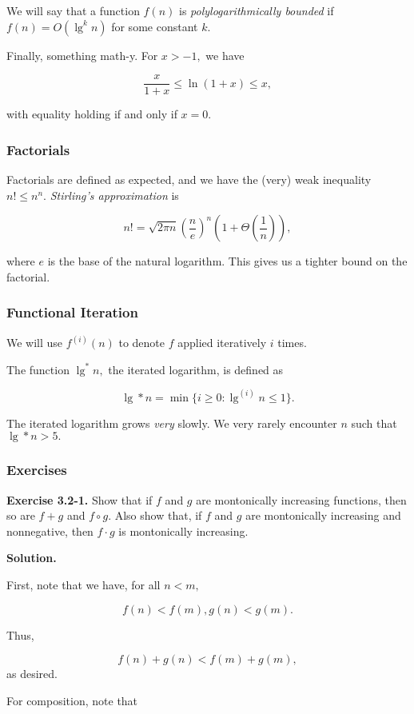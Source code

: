 \documentclass{article}
\newcommand{\exec}[2]
{\textbf{Exercise #1.} #2

\textbf{Solution.}}
\begin{document}
We will say that a function $f(n)$ is \textit{polylogarithmically bounded} if $f(n) = O(\lg^k n)$ for some constant $k.$

Finally, something math-y. For $x > -1,$ we have

$$\frac{x}{1+x} \leq \ln(1 + x) \leq x,$$

with equality holding if and only if $x = 0.$ 

\subsubsection{Factorials}

Factorials are defined as expected, and we have the (very) weak inequality $n! \leq n^n.$ \textit{Stirling's approximation} is

$$n! = \sqrt{2\pi n}\left(\frac{n}{e}\right)^n \left(1+\Theta\left( \frac{1}{n}\right)\right),$$

where $e$ is the base of the natural logarithm. This gives us a tighter bound on the factorial.

\subsubsection{Functional Iteration}

We will use $f^{(i)}(n)$ to denote $f$ applied iteratively $i$ times.

The function $\lg^* n,$ the iterated logarithm, is defined as

$$\lg* n = \min\{i \geq 0 : \lg^{(i)} n \leq 1\}.$$

The iterated logarithm grows \textit{very} slowly. We very rarely encounter $n$ such that $\lg* n > 5.$

\subsubsection{Exercises}

\exec{3.2-1}{Show that if $f$ and $g$ are montonically increasing functions, then so are $f+g$ and $f\circ g.$ Also show that, if $f$ and $g$ are montonically increasing and nonnegative, then $f\cdot g$ is montonically increasing.}

First, note that we have, for all $n < m,$

$$f(n) < f(m), g(n) < g(m).$$

Thus,

$$f(n) + g(n) < f(m) + g(m),$$
as desired.

For composition, note that
\end{document}
